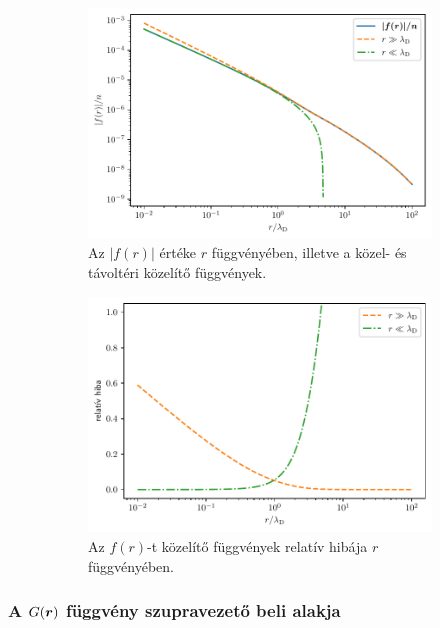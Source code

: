 \documentclass[a4paper,12pt,titlepage]{article}
\newcommand{\RR}{{\vb*{r}}}
\begin{document}
\begin{figure}[h!]
	\centering
	\begin{subfigure}{0.48\linewidth}
		\centering
		\includegraphics[width=\linewidth]{F_sc.pdf}
		\caption{\centering Az $\left| f(r) \right|$ értéke $r$ függvényében, illetve a közel- és távoltéri közelítő függvények.}
		\label{F-sc-fig}
	\end{subfigure}%
	\begin{subfigure}{0.48\linewidth}
		\centering
		\includegraphics[width=0.98\linewidth]{F_sc_error.pdf}
		\caption{\centering Az $f(r)$-t közelítő függvények relatív hibája $r$ függvényében.}
		\label{F-sc-error-fig}
	\end{subfigure}
	\caption{}
\end{figure}


\subsubsection{A $G(\RR)$ függvény szupravezető beli alakja}
\end{document}
